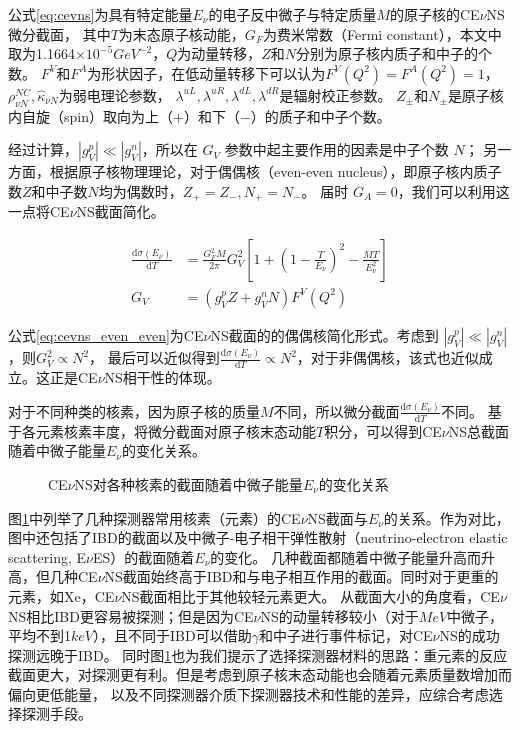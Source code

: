 公式\ref*{eq:cevns}为具有特定能量$E_{\nu}$的电子反中微子与特定质量$M$的原子核的CE$\nu$NS微分截面，
其中$T$为末态原子核动能，$G_F$为费米常数（Fermi constant），本文中取为1.1664$\times10^{-5}\si{GeV}^{-2}$，$Q$为动量转移，$Z$和$N$分别为原子核内质子和中子的个数。
$F^V$和$F^A$为形状因子，在低动量转移下可以认为$F^V(Q^2)=F^A(Q^2)=1$\cite{lewin_review_1996}，
$\rho_{\nu N}^{NC},\hat{\kappa}_{\nu N}$为弱电理论参数，
$\lambda^{uL},\lambda^{uR},\lambda^{dL},\lambda^{dR}$是辐射校正参数\cite{barranco_probing_2005}。
$Z_{\pm}$和$N_{\pm}$是原子核内自旋（spin）取向为上（$+$）和下（$-$）的质子和中子个数。

经过计算，$|g_V^p|\ll|g_V^n|$，所以在 $G_V$ 参数中起主要作用的因素是中子个数 $N$；
另一方面，根据原子核物理理论，对于偶偶核（even-even nucleus），即原子核内质子数$Z$和中子数$N$均为偶数时，$Z_{+}=Z_{-},N_{+}=N_{-}$。
届时 $G_A=0$，我们可以利用这一点将CE$\nu$NS截面简化。

\begin{align}
    \label{eq:cevns_even_even}
    \frac{\mathrm{d}\sigma(E_\nu)}{\mathrm{d}T} &= \frac{G_F^2 M}{2\pi}G_V^2\left[1+(1-\frac{T}{E_{\nu}})^2-\frac{MT}{E_{\nu}^2}\right] \\
    G_V &= (g_V^p Z+g_V^n N)F^V(Q^2)
\end{align}

公式\ref{eq:cevns_even_even}为CE$\nu$NS截面的的偶偶核简化形式。考虑到 $|g_V^p|\ll|g_V^n|$，则$G_V^2\propto N^2$，
最后可以近似得到$\frac{\mathrm{d}\sigma(E_\nu)}{\mathrm{d}T}\propto N^2$，对于非偶偶核，该式也近似成立。这正是CE$\nu$NS相干性的体现。

对于不同种类的核素，因为原子核的质量$M$不同，所以微分截面$\frac{\mathrm{d}\sigma(E_\nu)}{\mathrm{d}T}$不同。
基于各元素核素丰度\cite{lide2004crc}，将微分截面对原子核末态动能$T$积分，可以得到CE$\nu$NS总截面随着中微子能量$E_{\nu}$的变化关系。

\begin{figure}
    \centering
    
    \caption{\label{fig:xsec_elements} CE$\nu$NS对各种核素的截面随着中微子能量$E_{\nu}$的变化关系}
\end{figure}

图\ref{fig:xsec_elements}中列举了几种探测器常用核素（元素）的CE$\nu$NS截面与$E_{\nu}$的关系。作为对比，图中还包括了IBD\cite{akimov_observation_2017}的截面以及中微子-电子相干弹性散射（neutrino-electron elastic scattering, E$\nu$ES）的截面随着$E_{\nu}$的变化。
几种截面都随着中微子能量升高而升高，但几种CE$\nu$NS截面始终高于IBD和与电子相互作用的截面。同时对于更重的元素，如$\mathrm{Xe}$，CE$\nu$NS截面相比于其他较轻元素更大。
从截面大小的角度看，CE$\nu$NS相比IBD更容易被探测；但是因为CE$\nu$NS的动量转移较小（对于$\si{MeV}$中微子，平均不到1$\si{keV}$），且不同于IBD可以借助$\gamma$和中子进行事件标记，对CE$\nu$NS的成功探测远晚于IBD。
同时图\ref{fig:xsec_elements}也为我们提示了选择探测器材料的思路：重元素的反应截面更大，对探测更有利。但是考虑到原子核末态动能也会随着元素质量数增加而偏向更低能量，
以及不同探测器介质下探测器技术和性能的差异，应综合考虑选择探测手段。

